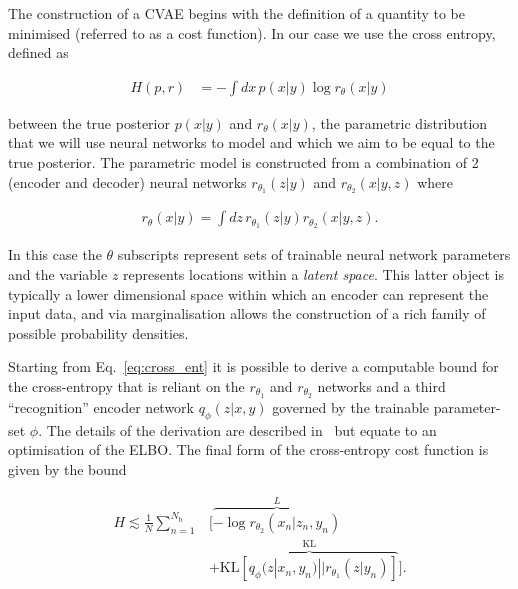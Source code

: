 \documentclass{article}
\begin{document}
%
%


The construction of a \ac{CVAE} begins with the definition of a quantity to be
minimised (referred to as a cost function). In our case we use the cross
entropy, defined as

\begin{align}\label{eq:cross_ent} 
H(p,r) &= -\int dx\, p(x|y) \log r_{\theta}(x|y) 
\end{align}

between the true posterior $p(x|y)$ and $r_{\theta}(x|y)$, the parametric
distribution that we will use neural networks to model and which we aim
to be equal to the true posterior. The parametric model is
constructed from a combination of 2 (encoder and decoder) neural networks
$r_{\theta_1}(z|y)$ and $r_{\theta_2}(x|y,z)$ where

\begin{align}\label{eq:latent_model}
r_{\theta}(x|y) = \int dz\,r_{\theta_1}(z|y)r_{\theta_2}(x|y,z).
\end{align}

In this case the $\theta$ subscripts represent sets of trainable neural network
parameters and the variable $z$ represents locations within a \emph{latent
space}. This latter object is typically a lower dimensional space within which
an encoder can represent the input data, and via marginalisation allows the
construction of a rich family of possible probability densities.

Starting from Eq.~\ref{eq:cross_ent} it is possible to derive a
computable bound for the cross-entropy that is reliant on the
$r_{\theta_1}$ and $r_{\theta_2}$ networks and a third ``recognition'' encoder
network $q_{\phi}(z|x,y)$ governed by the trainable parameter-set $\phi$. The
details of the derivation are described in~\cite{1904.06264,1909.06296} but equate to an 
optimisation of the \ac{ELBO}. The
final form of the cross-entropy cost function is given by the bound


\begin{align}\label{eq:cost3} H \lesssim
\frac{1}{N}\sum_{n=1}^{N_{\text{b}}}&\Big[\overbrace{-\log
r_{\theta_{2}}(x_{n}|z_{n},y_{n})}^{L}\nonumber\\
&+\overbrace{\text{KL}\left[q_{\phi}(z|x_{n},y_{n})||r_{\theta_{1}}(z|y_{n})\right]}^{\text{KL}}\Big].
\end{align}
\end{document}
